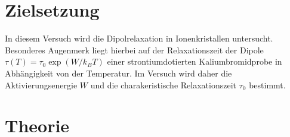 \section{Zielsetzung}
\label{sec:Zielsetzung}
In diesem Versuch wird die Dipolrelaxation in Ionenkristallen untersucht. Besonderes Augenmerk liegt hierbei auf der Relaxationszeit der Dipole
$\tau(T)=\tau_0 \exp(W/k_BT)$ einer strontiumdotierten Kaliumbromidprobe in Abhängigkeit von der Temperatur.
Im Versuch wird daher die Aktivierungsenergie $W$ und die charakeristische Relaxationszeit $\tau_0$ bestimmt.

\section{Theorie}
\label{sec:Theorie}


